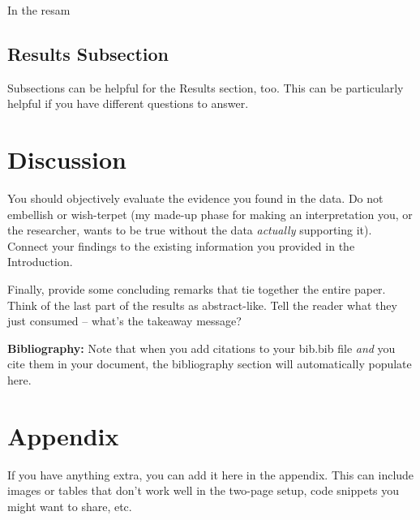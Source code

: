 \documentclass{article}\usepackage[]{graphicx}\usepackage[]{xcolor}
\begin{document}
\begin{multicols}{2}
In the resam

\subsection{Results Subsection}
Subsections can be helpful for the Results section, too. This can be particularly helpful if you have different questions to answer. 


\section{Discussion}
 You should objectively evaluate the evidence you found in the data. Do not embellish or wish-terpet (my made-up phase for making an interpretation you, or the researcher, wants to be true without the data \emph{actually} supporting it). Connect your findings to the existing information you provided in the Introduction.

Finally, provide some concluding remarks that tie together the entire paper. Think of the last part of the results as abstract-like. Tell the reader what they just consumed -- what's the takeaway message?

\vspace{2em}

\noindent\textbf{Bibliography:} Note that when you add citations to your bib.bib file \emph{and}
you cite them in your document, the bibliography section will automatically populate here.

\begin{tiny}

\end{tiny}
\end{multicols}

\newpage
\onecolumn
\section{Appendix}

If you have anything extra, you can add it here in the appendix. This can include images or tables that don't work well in the two-page setup, code snippets you might want to share, etc.
\end{document}
